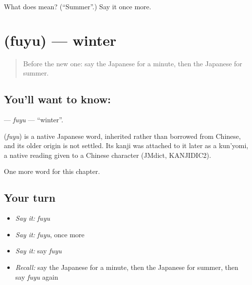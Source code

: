 \begin{tcolorbox}[breakable,colback=teal!4,colframe=teal!35!black,title={Before you move on}]
What does  mean? (\textquotedblleft{}Summer\textquotedblright{}.) Say it once more.
\end{tcolorbox}
\section[\texorpdfstring{\ja{ふゆ} (fuyu)}{ふゆ (fuyu)}]{ (fuyu) — winter}

\label{lesson:JA-C55-fuyu}



\begin{quote}
Before the new one: say the Japanese for a minute, then the Japanese for summer.
\end{quote}

\subsection*{You'll want to know: }
\textbf{} — \emph{fuyu} — \textquotedblleft{}winter\textquotedblright{}.

\begin{cousinweb}
\textbf{} (\emph{fuyu}) is a native Japanese word, inherited rather than borrowed from Chinese, and its older origin is not settled. Its kanji was attached to it later as a kun'yomi, a native reading given to a Chinese character (JMdict, KANJIDIC2).
\end{cousinweb}

\begin{grammarlens}[title={What you've built}]
One more word for this chapter.
\end{grammarlens}

\subsection*{Your turn}
\begin{itemize}
\raggedright
  \item \emph{Say it:} \emph{fuyu}
  \item \emph{Say it:} \emph{fuyu}, once more
  \item \emph{Say it:} say \emph{fuyu}
  \item \emph{Recall:} say the Japanese for a minute, then the Japanese for summer, then say \emph{fuyu} again
\end{itemize}


